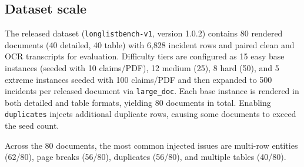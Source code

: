 \subsection{Dataset scale}
The released dataset (\texttt{longlistbench-v1}, version 1.0.2) contains 80 rendered documents (40 detailed, 40 table) with 6{,}828 incident rows and paired clean and OCR transcripts for evaluation. Difficulty tiers are configured as 15 easy base instances (seeded with 10 claims/PDF), 12 medium (25), 8 hard (50), and 5 extreme instances seeded with 100 claims/PDF and then expanded to 500 incidents per released document via \texttt{large\_doc}. Each base instance is rendered in both detailed and table formats, yielding 80 documents in total. Enabling \texttt{duplicates} injects additional duplicate rows, causing some documents to exceed the seed count.

Across the 80 documents, the most common injected issues are multi-row entities (62/80), page breaks (56/80), duplicates (56/80), and multiple tables (40/80).
